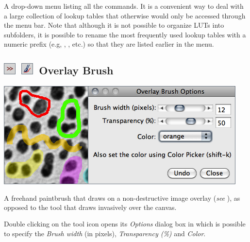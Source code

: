 A drop-down menu listing all the 
commands. It is a convenient way to deal with a large collection of
lookup tables that otherwise would only be accessed through the menu
bar. Note that although it is not possible to organize LUTs into subfolders,
it is possible to rename the most frequently used lookup tables with
a numeric prefix (e.g, ,
,
etc.) so that they are listed earlier in the menu.




\subsection[Overlay Brush]{\noindent \textsf{\protect\includegraphics[bb=0bp 5bp 20bp 20bp,scale=0.6]{images/tools/Switcher}}~\textsf{\protect\includegraphics[bb=0bp 5bp 20bp 20bp,scale=0.6]{images/tools/Brush2}}~Overlay
Brush\label{sub:OverlayBrush}\feature{}}

\begin{minipage}[c][1\totalheight][t]{0.645\columnwidth}%
\includegraphics[scale=0.55]{images/OverlayBrush}%
\end{minipage}%
\begin{minipage}[c][1\totalheight][t]{0.355\columnwidth}%
A freehand paintbrush that draws on a non-destructive image overlay
(\emph{see} ), as opposed to the 
tool that draws invasively over the canvas.\medskip{}


Double clicking on the tool icon opens its \emph{Options} dialog box
in which is possible to specify the \emph{Brush width} (in pixels),
\emph{Transparency (\%)} and \emph{Color}.%
\end{minipage}

